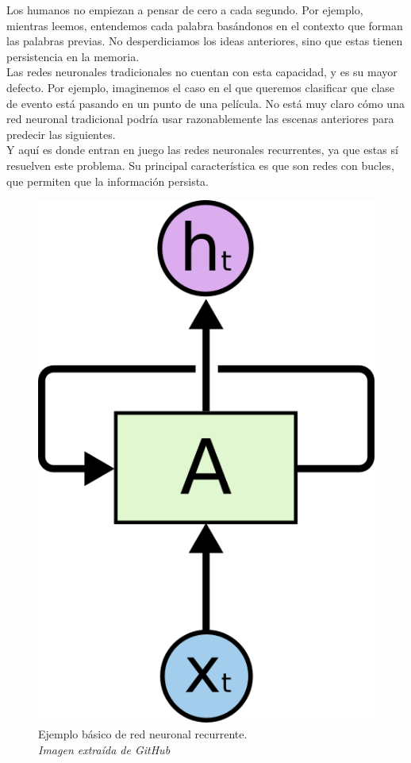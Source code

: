 \label{redes_neuronales_recurrentes}
Los humanos no empiezan a pensar de cero a cada segundo. Por ejemplo, mientras leemos, entendemos cada palabra basándonos en el contexto que forman las palabras previas. No desperdiciamos los ideas anteriores, sino que estas tienen persistencia en la memoria.\\
Las redes neuronales tradicionales no cuentan con esta capacidad, y es su mayor defecto. Por ejemplo, imaginemos el caso en el que queremos clasificar que clase de evento está pasando en un punto de una película. No está muy claro cómo una red neuronal tradicional podría usar razonablemente las escenas anteriores para predecir las siguientes.\\
Y aquí es donde entran en juego las redes neuronales recurrentes, ya que estas sí resuelven este problema. Su principal característica es que son redes con bucles, que permiten que la información persista.\\
\begin{figure}[htp]
\centering
\vspace{-1.5em}
\includegraphics[scale=0.3]{images/rnnrolled.png}
\caption{Ejemplo básico de red neuronal recurrente.\\\textit{Imagen extraída de GitHub}}
\label{rnn1}
\end{figure}
